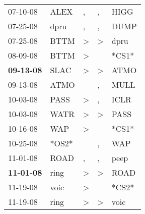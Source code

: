 \begin{supertabular}{p{0.07\textwidth}p{0.06\textwidth}p{0.02\textwidth}p{0.02\textwidth}p{0.06\textwidth}}
          07-10-08\textsuperscript{} &           ALEX\textsuperscript{} &                , &                , &           HIGG\textsuperscript{} \\
          07-25-08\textsuperscript{} &           dpru\textsuperscript{} &                , &                , &           DUMP\textsuperscript{} \\
          07-25-08\textsuperscript{} &           BTTM\textsuperscript{} &     \textgreater &     \textgreater &           dpru\textsuperscript{} \\
          08-09-08\textsuperscript{} &           BTTM\textsuperscript{} &     \textgreater &                  &                            *CS1* \\
 \textbf{09-13-08\textsuperscript{}} &           SLAC\textsuperscript{} &     \textgreater &     \textgreater &           ATMO\textsuperscript{} \\
          09-13-08\textsuperscript{} &           ATMO\textsuperscript{} &                  &                , &           MULL\textsuperscript{} \\
          10-03-08\textsuperscript{} &           PASS\textsuperscript{} &     \textgreater &                , &           ICLR\textsuperscript{} \\
          10-03-08\textsuperscript{} &           WATR\textsuperscript{} &     \textgreater &     \textgreater &           PASS\textsuperscript{} \\
          10-16-08\textsuperscript{} &            WAP\textsuperscript{} &     \textgreater &                  &                            *CS1* \\
          10-25-08\textsuperscript{} &                            *OS2* &                  &                , &            WAP\textsuperscript{} \\
          11-01-08\textsuperscript{} &           ROAD\textsuperscript{} &                , &                , &           peep\textsuperscript{} \\
 \textbf{11-01-08\textsuperscript{}} &           ring\textsuperscript{} &     \textgreater &     \textgreater &           ROAD\textsuperscript{} \\
          11-19-08\textsuperscript{} &           voic\textsuperscript{} &     \textgreater &                  &                            *CS2* \\
          11-19-08\textsuperscript{} &           ring\textsuperscript{} &     \textgreater &     \textgreater &           voic\textsuperscript{} \\

\end{supertabular}
